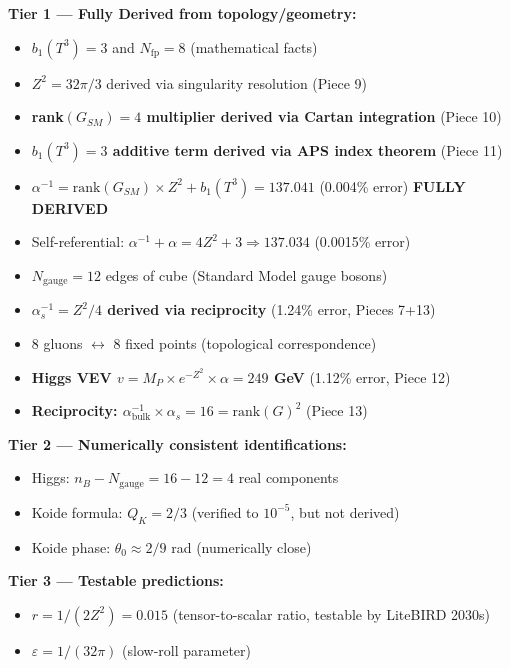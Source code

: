 \documentclass[12pt,a4paper]{article}
\newcommand{\Zsq}{Z^2}
\begin{document}
\begin{tcolorbox}[colback=red!5!white, colframe=red!60!black, title=Epistemic Classification of All Claims (v8.7.0)]
\textbf{Tier 1 --- Fully Derived from topology/geometry:}
\begin{itemize}[itemsep=0pt]
    \item $b_1(T^3) = 3$ and $N_{\text{fp}} = 8$ (mathematical facts)
    \item $\Zsq = 32\pi/3$ derived via singularity resolution (Piece 9)
    \item \textbf{rank$(G_{SM}) = 4$ multiplier derived via Cartan integration} (Piece 10)
    \item \textbf{$b_1(T^3) = 3$ additive term derived via APS index theorem} (Piece 11)
    \item $\alpha^{-1} = \text{rank}(G_{SM}) \times \Zsq + b_1(T^3) = 137.041$ (0.004\% error) \textbf{FULLY DERIVED}
    \item Self-referential: $\alpha^{-1} + \alpha = 4\Zsq + 3 \Rightarrow 137.034$ (0.0015\% error)
    \item $N_{\text{gauge}} = 12$ edges of cube (Standard Model gauge bosons)
    \item \textbf{$\alpha_s^{-1} = \Zsq/4$ derived via reciprocity} (1.24\% error, Pieces 7+13)
    \item 8 gluons $\leftrightarrow$ 8 fixed points (topological correspondence)
    \item \textbf{Higgs VEV $v = M_P \times e^{-\Zsq} \times \alpha = 249$ GeV} (1.12\% error, Piece 12)
    \item \textbf{Reciprocity: $\alpha^{-1}_{\text{bulk}} \times \alpha_s = 16 = \text{rank}(G)^2$} (Piece 13)
\end{itemize}

\textbf{Tier 2 --- Numerically consistent identifications:}
\begin{itemize}[itemsep=0pt]
    \item Higgs: $n_B - N_{\text{gauge}} = 16 - 12 = 4$ real components
    \item Koide formula: $Q_K = 2/3$ (verified to $10^{-5}$, but not derived)
    \item Koide phase: $\theta_0 \approx 2/9$ rad (numerically close)
\end{itemize}

\textbf{Tier 3 --- Testable predictions:}
\begin{itemize}[itemsep=0pt]
    \item $r = 1/(2\Zsq) = 0.015$ (tensor-to-scalar ratio, testable by LiteBIRD 2030s)
    \item $\varepsilon = 1/(32\pi)$ (slow-roll parameter)
\end{itemize}


\end{tcolorbox}
\end{document}

